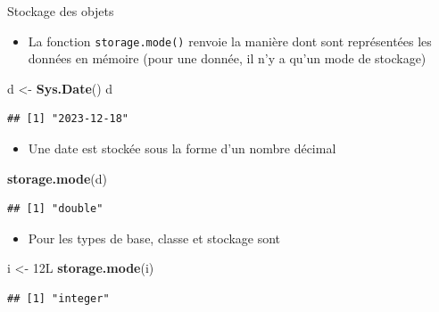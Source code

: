 \documentclass[
  ignorenonframetext,
]{beamer}
\newenvironment{Shaded}{\begin{snugshade}}{\end{snugshade}}
\newcommand{\DataTypeTok}[1]{\textcolor[rgb]{0.13,0.29,0.53}{#1}}
\newcommand{\DecValTok}[1]{\textcolor[rgb]{0.00,0.00,0.81}{#1}}
\newcommand{\FunctionTok}[1]{\textcolor[rgb]{0.13,0.29,0.53}{\textbf{#1}}}
\newcommand{\NormalTok}[1]{#1}
\newcommand{\OtherTok}[1]{\textcolor[rgb]{0.56,0.35,0.01}{#1}}
\providecommand{\tightlist}{%
  \setlength{\itemsep}{0pt}\setlength{\parskip}{0pt}}
\begin{document}
\begin{frame}[fragile]{Stockage des objets}
\protect\hypertarget{stockage-des-objets}{}
\begin{itemize}
\tightlist
\item
  La fonction \texttt{storage.mode()} renvoie la manière dont sont
  représentées les données en mémoire (pour une donnée, il n'y a qu'un
  mode de stockage)
\end{itemize}

\tiny

\begin{Shaded}
\begin{Highlighting}[]
\NormalTok{d }\OtherTok{\textless{}{-}} \FunctionTok{Sys.Date}\NormalTok{()}
\NormalTok{d}
\end{Highlighting}
\end{Shaded}

\begin{verbatim}
## [1] "2023-12-18"
\end{verbatim}

\normalsize

\begin{itemize}
\tightlist
\item
  Une date est stockée sous la forme d'un nombre décimal
\end{itemize}

\tiny

\begin{Shaded}
\begin{Highlighting}[]
\FunctionTok{storage.mode}\NormalTok{(d)}
\end{Highlighting}
\end{Shaded}

\begin{verbatim}
## [1] "double"
\end{verbatim}

\normalsize

\begin{itemize}
\tightlist
\item
  Pour les types de base, classe et stockage sont
\end{itemize}

\tiny

\begin{Shaded}
\begin{Highlighting}[]
\NormalTok{i }\OtherTok{\textless{}{-}} \DecValTok{12}\DataTypeTok{L}
\FunctionTok{storage.mode}\NormalTok{(i)}
\end{Highlighting}
\end{Shaded}

\begin{verbatim}
## [1] "integer"
\end{verbatim}

\normalsize
\end{frame}
\end{document}
